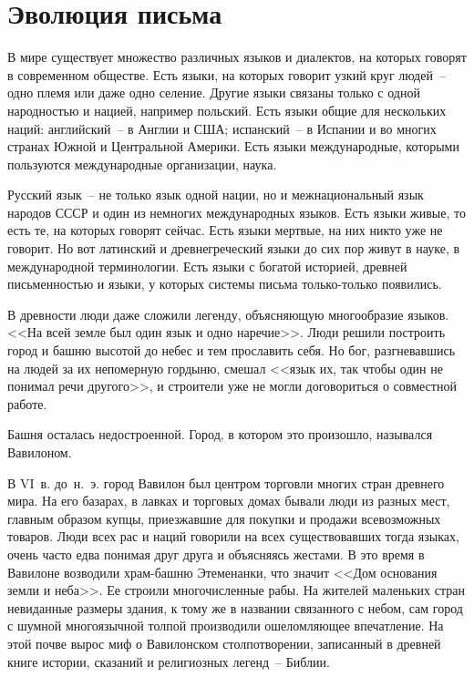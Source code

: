   \section{Эволюция письма}
  
  В мире существует множество различных языков и диалектов, на которых говорят
  в современном обществе. Есть языки, на которых говорит узкий круг людей~--
  одно племя или даже одно селение. Другие языки связаны только с одной
  народностью и нацией, например польский. Есть языки общие для нескольких
  наций: английский~-- в Англии и США; испанский~-- в Испании и во многих
  странах Южной и Центральной Америки. Есть языки международные, которыми
  пользуются международные организации, наука.
  
  Русский язык~-- не только язык одной нации, но и межнациональный язык народов
  СССР и один из немногих международных языков. Есть языки живые, то есть те,
  на которых говорят сейчас. Есть языки мертвые, на них никто уже не говорит.
  Но вот латинский и древнегреческий языки до сих пор живут в науке, в
  международной терминологии. Есть языки с богатой историей, древней
  письменностью и языки, у которых системы письма только-только появились.
  
  В древности люди даже сложили легенду, объясняющую многообразие языков. <<На
  всей земле был один язык и одно наречие>>. Люди решили построить город и
  башню высотой до небес и тем прославить себя. Но бог, разгневавшись на людей
  за их непомерную гордыню, смешал <<язык их, так чтобы один не понимал речи
  другого>>, и строители уже не могли договориться о совместной работе.
  
  Башня осталась недостроенной. Город, в котором это произошло, назывался
  Вавилоном.
  
  В VI~в. до~н.~э. город Вавилон был центром торговли многих стран древнего
  мира. На его базарах, в лавках и торговых домах бывали люди из разных мест,
  главным образом купцы, приезжавшие для покупки и продажи всевозможных
  товаров. Люди всех рас и наций говорили на всех существовавших тогда языках,
  очень часто едва понимая друг друга и объясняясь жестами. В это время в
  Вавилоне возводили храм-башню Этеменанки, что значит <<Дом основания земли и
  неба>>. Ее строили многочисленные рабы. На жителей маленьких стран невиданные
  размеры здания, к тому же в названии связанного с небом, сам город с шумной
  многоязычной толпой производили ошеломляющее впечатление. На этой почве вырос
  миф о Вавилонском столпотворении, записанный в древней книге истории,
  сказаний и религиозных легенд~-- Библии.
  
